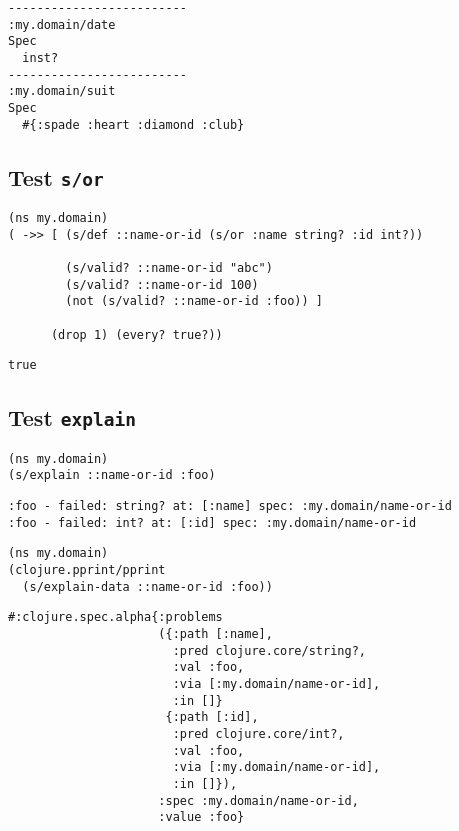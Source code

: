 \documentclass[10pt,oneside,x11names]{article}
\begin{document}
\begin{verbatim}
-------------------------
:my.domain/date
Spec
  inst?
-------------------------
:my.domain/suit
Spec
  #{:spade :heart :diamond :club}
\end{verbatim}

\subsection{Test \texttt{s/or}}
\label{sec:orge4903fd}

\begin{verbatim}
(ns my.domain)
( ->> [ (s/def ::name-or-id (s/or :name string? :id int?))

        (s/valid? ::name-or-id "abc")
        (s/valid? ::name-or-id 100)
        (not (s/valid? ::name-or-id :foo)) ]

      (drop 1) (every? true?))
\end{verbatim}

\begin{verbatim}
true
\end{verbatim}

\subsection{Test \texttt{explain}}
\label{sec:org822ebae}

\begin{verbatim}
(ns my.domain)
(s/explain ::name-or-id :foo)
\end{verbatim}

\begin{verbatim}
:foo - failed: string? at: [:name] spec: :my.domain/name-or-id
:foo - failed: int? at: [:id] spec: :my.domain/name-or-id
\end{verbatim}


\begin{verbatim}
(ns my.domain)
(clojure.pprint/pprint
  (s/explain-data ::name-or-id :foo))
\end{verbatim}

\begin{verbatim}
#:clojure.spec.alpha{:problems
                     ({:path [:name],
                       :pred clojure.core/string?,
                       :val :foo,
                       :via [:my.domain/name-or-id],
                       :in []}
                      {:path [:id],
                       :pred clojure.core/int?,
                       :val :foo,
                       :via [:my.domain/name-or-id],
                       :in []}),
                     :spec :my.domain/name-or-id,
                     :value :foo}
\end{verbatim}
\end{document}
